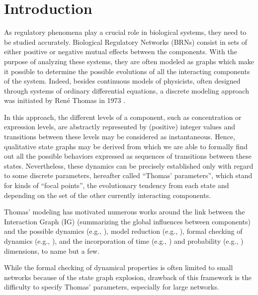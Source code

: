\section{Introduction}\label{sec:intro}

As regulatory phenomena play a crucial role in biological systems, they need to be studied accurately.
Biological Regulatory Networks (BRNs) consist in sets of either positive or negative mutual effects between the components.
With the purpose of analyzing these systems, they are often modeled as graphs which make it possible to determine the possible evolutions of all the interacting components of the system.
Indeed, besides continuous models of physicists, often designed through systems of ordinary
differential equations, a discrete modeling approach was initiated by René Thomas in 1973
\cite{Thomas73}.

In this approach, the different levels of a component, such as concentration or expression levels, are abstractly represented by (positive) integer values and transitions between these levels may be considered as instantaneous.
Hence, qualitative state graphs may be derived from which we are able to formally find out all the possible behaviors expressed as sequences of transitions between these states.
Nevertheless, these dynamics can be precisely established only with regard to some discrete parameters,
hereafter called ``Thomas' parameters'',
which stand for kinds of ``focal points'', \ie the evolutionary tendency from each state and depending on the set of the other currently interacting components.

Thomas' modeling has motivated numerous works around the link between the Interaction Graph (IG)
(summarizing the global influences between components) and the possible dynamics (e.g.,
\cite{RiCo07,RRT08}),
model reduction (e.g., \cite{Naldi09}), formal checking of dynamics (e.g., \cite{Richard06,Naldi07}), 
and the incorporation of time (e.g., \cite{Siebert06,Ahmad08}) and probability
(e.g., \cite{Twardziok10-CMSB}) dimensions, to name but a few.

While the formal checking of dynamical properties is often limited to small networks because of the
state graph explosion,  drawback of this framework is the difficulty to
specify Thomas' parameters, especially for large networks.

